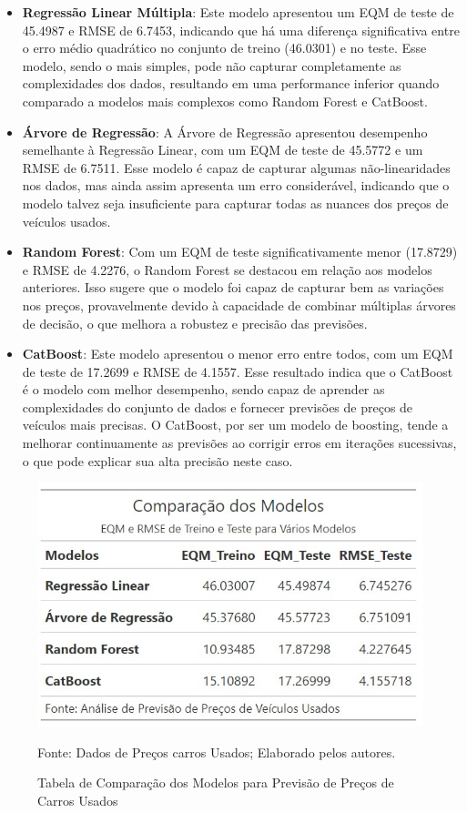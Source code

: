 \documentclass[a4paper,12pt]{article}[abntex2]
\begin{document}
\begin{itemize}
    \item \textbf{Regressão Linear Múltipla}: Este modelo apresentou um EQM de teste de 45.4987 e RMSE de 6.7453, indicando que há uma diferença significativa entre o erro médio quadrático no conjunto de treino (46.0301) e no teste. Esse modelo, sendo o mais simples, pode não capturar completamente as complexidades dos dados, resultando em uma performance inferior quando comparado a modelos mais complexos como Random Forest e CatBoost.

    \item \textbf{Árvore de Regressão}: A Árvore de Regressão apresentou desempenho semelhante à Regressão Linear, com um EQM de teste de 45.5772 e um RMSE de 6.7511. Esse modelo é capaz de capturar algumas não-linearidades nos dados, mas ainda assim apresenta um erro considerável, indicando que o modelo talvez seja insuficiente para capturar todas as nuances dos preços de veículos usados.

    \item \textbf{Random Forest}: Com um EQM de teste significativamente menor (17.8729) e RMSE de 4.2276, o Random Forest se destacou em relação aos modelos anteriores. Isso sugere que o modelo foi capaz de capturar bem as variações nos preços, provavelmente devido à capacidade de combinar múltiplas árvores de decisão, o que melhora a robustez e precisão das previsões.

    \item \textbf{CatBoost}: Este modelo apresentou o menor erro entre todos, com um EQM de teste de 17.2699 e RMSE de 4.1557. Esse resultado indica que o CatBoost é o modelo com melhor desempenho, sendo capaz de aprender as complexidades do conjunto de dados e fornecer previsões de preços de veículos mais precisas. O CatBoost, por ser um modelo de boosting, tende a melhorar continuamente as previsões ao corrigir erros em iterações sucessivas, o que pode explicar sua alta precisão neste caso.
\end{itemize}

\begin{figure}[H]
    \centering
    \caption{Tabela de Comparação dos Modelos para Previsão de Preços de Carros Usados} 
    \includegraphics[width=1.0\textwidth]{APS/i1A2.png}
    \label{fig:i2A2}
    
    \footnotesize{Fonte: Dados de Preços carros Usados; Elaborado pelos autores.}
\end{figure}
\end{document}
